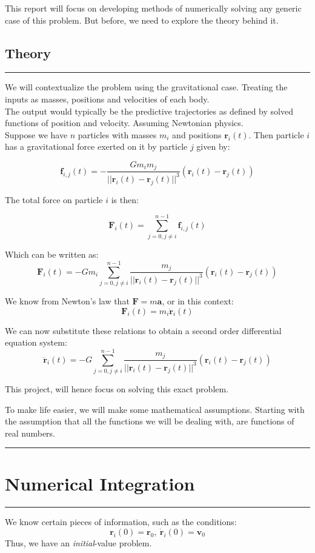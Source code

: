 \documentclass[hidelinks, 11pt, dvipsnames]{article}
\newcommand{\psection}[1]{{
    \begin{center}
        \noindent \rule{17cm}{0.4pt}
        \section*{\LARGE #1}
        \noindent \rule{17cm}{0.4pt}
    \end{center}
}}
\newcommand{\psubsection}[1]{{
    \begin{center}
        \section*{\Large #1}
        \noindent \rule{17cm}{0.2pt}
    \end{center}
}}
\begin{document}
    This report will focus on developing methods of numerically solving any generic case of this problem. But before, we need to explore the theory behind it.

    \newpage
    \psubsection{Theory}
    We will contextualize the problem using the gravitational case. Treating the inputs as masses, positions and velocities of each body. \\

    The output would typically be the predictive trajectories as defined by solved functions of position and velocity. Assuming Newtonian physics. \\

    Suppose we have $n$ particles with masses $m_i$ and positions $\mathbf{r}_i(t)$. Then particle $i$ has a gravitational force exerted on it by particle $j$ given by:

    $$ \mathbf{f}_{i,j}(t) = -\frac{Gm_i m_j}{|| \mathbf{r}_i(t) - \mathbf{r}_j(t) ||^3}(\mathbf{r}_i(t) - \mathbf{r}_j(t)) $$

    The total force on particle $i$ is then:

    $$ \mathbf{F}_i(t) = \sum_{j=0, j\ne i}^{n-1} \mathbf{f}_{i,j}(t) $$

    Which can be written as:
    $$ \mathbf{F}_i(t) = -Gm_i \sum_{j=0, j\ne i}^{n-1} \frac{ m_j}{|| \mathbf{r}_i(t) - \mathbf{r}_j(t) ||^3}(\mathbf{r}_i(t) - \mathbf{r}_j(t)) $$

    We know from Newton's law that $\mathbf{F} = m\mathbf{a}$, or in this context:
    $$ \mathbf{F}_i(t) = m_i\mathbf{\ddot{r}}_i(t) $$

    We can now substitute these relations to obtain a second order differential equation system:
    $$ \mathbf{\ddot{r}}_i(t) = -G \sum_{j=0, j\ne i}^{n-1} \frac{ m_j}{|| \mathbf{r}_i(t) - \mathbf{r}_j(t) ||^3}(\mathbf{r}_i(t) - \mathbf{r}_j(t)) $$

    This project, will hence focus on solving this exact problem.

    To make life easier, we will make some mathematical assumptions. Starting with the assumption that all the functions we will be dealing with, are functions of real numbers.

    \newpage

    \psection{Numerical Integration}

    We know certain pieces of information, such as the conditions:
    $$ \mathbf{r}_i(0) = \mathbf{r}_0,\ \mathbf{\dot{r}}_i(0) = \mathbf{v}_0 $$
    Thus, we have an \emph{initial}-value problem. \\
\end{document}

